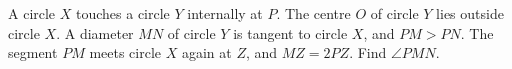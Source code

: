A circle $X$ touches a circle $Y$ internally at $P$. The centre $O$ of circle $Y$ lies outside circle $X$. A diameter $MN$ of circle $Y$ is tangent to circle $X$, and $PM>PN$. The segment $PM$ meets circle $X$ again at $Z$, and $MZ=2PZ$. Find $\angle PMN$.
